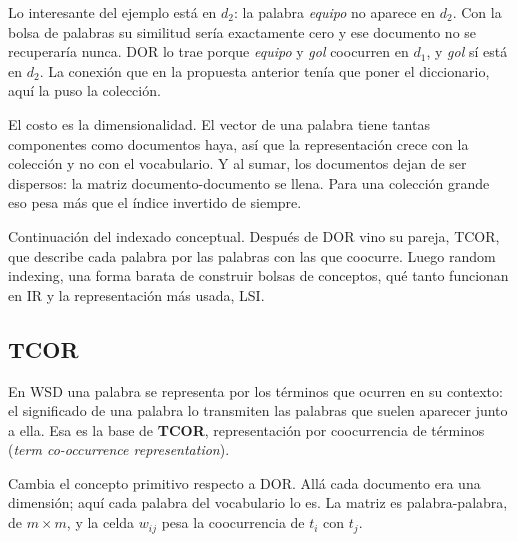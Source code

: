 \documentclass[11pt,letterpaper]{article}
\begin{document}
\begin{idea}
    Lo interesante del ejemplo está en $d_2$: la palabra
    \textit{equipo} no aparece en $d_2$. Con la bolsa de palabras su
    similitud sería exactamente cero y ese documento no se
    recuperaría nunca. DOR lo trae porque \textit{equipo} y
    \textit{gol} coocurren en $d_1$, y \textit{gol} sí está en $d_2$.
    La conexión que en la propuesta anterior tenía que poner el
    diccionario, aquí la puso la colección.
\end{idea}

\begin{ojo}
    El costo es la dimensionalidad. El vector de una palabra tiene
    tantas componentes como documentos haya, así que la
    representación crece con la colección y no con el vocabulario. Y
    al sumar, los documentos dejan de ser dispersos: la matriz
    documento-documento se llena. Para una colección grande eso pesa
    más que el índice invertido de siempre.
\end{ojo}

\newpage


\begin{quick_sum}
    Continuación del indexado conceptual. Después de DOR vino su
    pareja, TCOR, que describe cada palabra por las palabras con las
    que coocurre. Luego random indexing, una forma barata de construir
    bolsas de conceptos, qué tanto funcionan en IR y la
    representación más usada, LSI.
\end{quick_sum}

\subsection*{TCOR}

En WSD una palabra se representa por los términos que ocurren en su
contexto: el significado de una palabra lo transmiten las palabras
que suelen aparecer junto a ella. Esa es la base de \textbf{TCOR},
representación por coocurrencia de términos (\textit{term
co-occurrence representation}).

Cambia el concepto primitivo respecto a DOR. Allá cada documento era
una dimensión; aquí cada palabra del vocabulario lo es. La matriz es
palabra-palabra, de $m \times m$, y la celda $w_{ij}$ pesa la
coocurrencia de $t_i$ con $t_j$.
\end{document}
